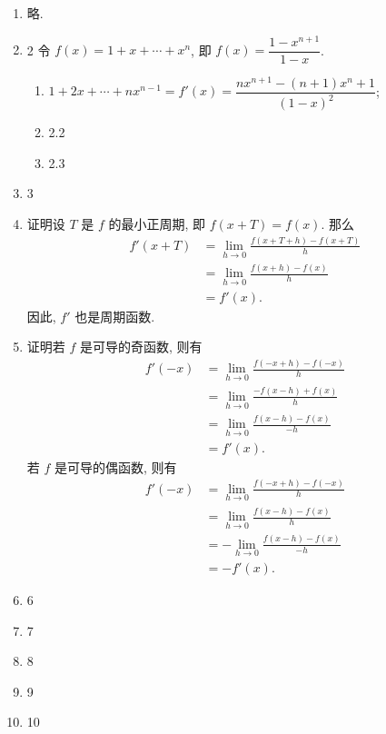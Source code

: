 \documentclass[a4paper, 11pt]{ctexart}
\begin{document}
\pagestyle{empty}
\begin{enumerate}
    \item %
        略.
    \item 2
        令 $f(x) = 1 + x + \cdots + x^n$, 即 $f(x) = \dfrac{1-x^{n+1}}{1-x}$.
        \begin{enumerate}[(1)]
            \item %
                $1 + 2x + \cdots + nx^{n-1} = f'(x) = \dfrac{nx^{n+1} - (n+1)x^n + 1}{(1-x)^2}$;
            \item 2.2
            \item 2.3
        \end{enumerate}
    \item 3
    \item %
        {\heiti 证明}\quad 设 $T$ 是 $f$ 的最小正周期, 即 $f(x + T) = f(x)$. 那么
        \begin{align*}
            f'(x + T) &= \lim_{h\to0}\frac{f(x+T+h) - f(x+T)}{h} \\
                      &= \lim_{h\to0}\frac{f(x+h) - f(x)}{h} \\
                      &= f'(x).    
        \end{align*}
        因此, $f'$ 也是周期函数.
    \item %
        {\heiti 证明}\quad 若 $f$ 是可导的奇函数, 则有
        \begin{align*}
            f'(-x) &= \lim_{h\to0}\frac{f(-x+h) - f(-x)}{h} \\
                   &= \lim_{h\to0}\frac{-f(x-h) + f(x)}{h} \\
                   &= \lim_{h\to0}\frac{f(x-h) - f(x)}{-h} \\
                   &= f'(x).  
        \end{align*}
        若 $f$ 是可导的偶函数, 则有
        \begin{align*}
            f'(-x) &= \lim_{h\to0}\frac{f(-x+h) - f(-x)}{h} \\
                   &= \lim_{h\to0}\frac{f(x-h) - f(x)}{h} \\
                   &= -\lim_{h\to0}\frac{f(x-h) - f(x)}{-h} \\
                   &= -f'(x).
        \end{align*}
    \item 6
    \item 7
    \item 8
    \item 9
    \item 10
\end{enumerate}
\end{document}
